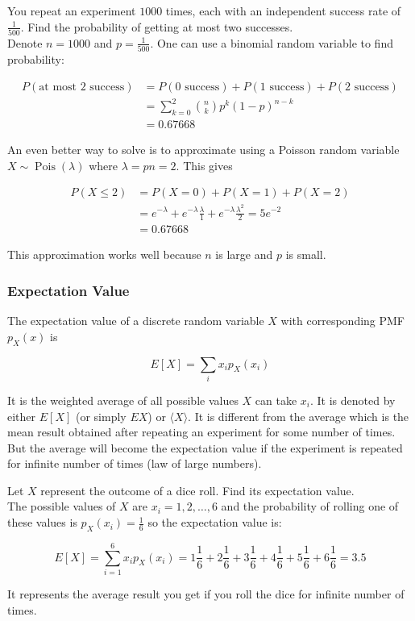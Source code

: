 \documentclass[12pt, a4paper]{article}
\newcounter{exa}
\newcommand{\Pois}{\operatorname{Pois}}
\begin{document}
\begin{texample}
You repeat an experiment $1000$ times, each with an independent success rate of $\frac{1}{500}$. Find the probability of getting at most two successes. \\

Denote $n=1000$ and $p=\frac{1}{500}$. One can use a binomial random variable to find probability:

\begin{align*}
P(\text{at most 2 success}) &= P(\text{0 success})+P(\text{1 success})+P(\text{2 success}) \\
&= \sum_{k=0}^2 {n\choose k} p^k (1-p)^{n-k} \\
&= 0.67668
\end{align*}

An even better way to solve is to approximate using a Poisson random variable $X\sim\Pois(\lambda)$ where $\lambda=pn=2$. This gives

\begin{align*}
P(X \le 2)&=P(X=0)+P(X=1)+P(X=2) \\
&=e^{-\lambda}+e^{-\lambda}\frac{\lambda}{1}+e^{-\lambda}\frac{\lambda^2}{2}=5e^{-2} \\
&=0.67668
\end{align*}

This approximation works well because $n$ is large and $p$ is small.
\end{texample}

\subsubsection{Expectation Value}

The expectation value of a discrete random variable $X$ with corresponding PMF $p_X(x)$ is

$$E[X]=\sum_i x_i p_X(x_i)$$

It is the weighted average of all possible values $X$ can take $x_i$. It is denoted by either $E[X]$ (or simply $EX$) or $\langle X \rangle$. It is different from the average which is the mean result obtained after repeating an experiment for some number of times. But the average will become the expectation value if the experiment is repeated for infinite number of times (law of large numbers).

\begin{texample}
Let $X$ represent the outcome of a dice roll. Find its expectation value. \\

The possible values of $X$ are $x_i=1, 2, \dots, 6$ and the probability of rolling one of these values is $p_X(x_i)=\frac16$ so the expectation value is:

$$E[X]=\sum_{i=1}^6 x_i p_X(x_i)=1\frac16+2\frac16+3\frac16+4\frac16+5\frac16+6\frac16=3.5$$

It represents the average result you get if you roll the dice for infinite number of times.
\end{texample}
\end{document}
